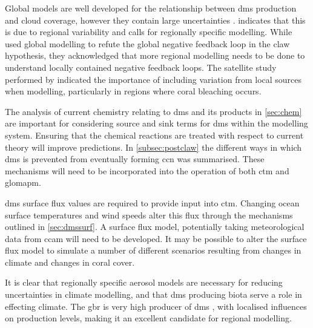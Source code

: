 	Global models are well developed for the relationship between \gls{dms} production and cloud coverage, however they contain large uncertainties \citep{woodhouse:2010ed}. \citet{cainey:2007jj} indicates that this is due to regional variability and calls for regionally specific modelling. While \citet{quinn:2011iv} used global modelling to refute the global negative feedback loop in the \gls{claw} hypothesis, they acknowledged that more regional modelling needs to be done to understand locally contained negative feedback loops. The satellite study performed by \citet{leahy:2013en} indicated the importance of including variation from local sources when modelling, particularly in regions where coral bleaching occurs. 

	The analysis of current chemistry relating to \gls{dms} and its products in \cref{sec:chem} are important for considering source and sink terms for \gls{dms} within the modelling system. Ensuring that the chemical reactions are treated with respect to current theory will improve predictions. In \cref{subsec:postclaw} the different ways in which \gls{dms} is prevented from eventually forming \gls{ccn} was summarised. These mechanisms will need to be incorporated into the operation of both \gls{ctm} and \gls{glomapm}.

	\gls{dms} surface flux values are required to provide input into \gls{ctm}. Changing ocean surface temperatures and wind speeds alter this flux through the mechanisms outlined in \cref{sec:dmssurf}. A surface flux model, potentially taking meteorological data from \gls{ccam} will need to be developed. It may be possible to alter the surface flux model to simulate a number of different scenarios resulting from changes in climate and changes in coral cover.

	It is clear that regionally specific aerosol models are necessary for reducing uncertainties in climate modelling, and that \gls{dms} producing biota serve a role in effecting climate. The \gls{gbr} is very high producer of \gls{dms} \citep{jones:2005ez}, with localised influences on production levels, making it an excellent candidate for regional modelling. 



